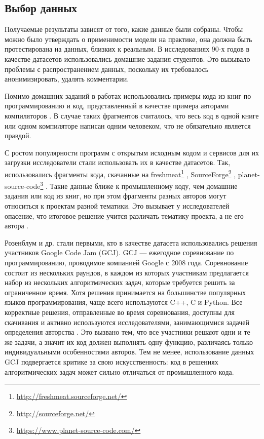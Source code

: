 \subsection{Выбор данных}

Получаемые результаты зависят от того, какие данные были собраны. Чтобы можно было утверждать о применимости модели на практике, она должна быть протестирована на данных, близких к реальным. В исследованиях 90-х годов \cite{Krsul1997, Leach1995} в качестве датасетов использовались домашние задания студентов. Это вызывало проблемы с распространением данных, поскольку их требовалось анонимизировать, удалять комментарии.

Помимо домашних заданий в работах использовались примеры кода из книг по программированию и код, представленный в качестве примера авторами компиляторов \cite{Macdonell1999, Oman1989}. В случае таких фрагментов считалось, что весь код в одной книге или одном компиляторе написан одним человеком, что не обязательно является правдой.

С ростом популярности программ с открытым исходным кодом и сервисов для их загрузки исследователи стали использовать их в качестве датасетов. Так, использовались фрагменты кода, скачанные на freshmeat\footnote{\url{http://freshmeat.sourceforge.net/}} \cite{Frantzeskou2006}, SourceForge\footnote{\url{http://sourceforge.net/}} \cite{Lange2007, Shevertalov2009}, planet-source-code\footnote{\url{https://www.planet-source-code.com/}} \cite{Bandara2013}. Такие данные ближе к промышленному коду, чем домашние задания или код из книг, но при этом фрагменты разных авторов могут относиться к проектам разной тематики. Это вызывает у исследователей опасение, что итоговое решение учится различать тематику проекта, а не его автора \cite{Caliskan2015}.

Розенблум и др. \cite{Rosenblum2011} стали первыми, кто в качестве датасета использовались решения участников Google Code Jam (GCJ). GCJ — ежегодное соревнование по программированию, проводимое компанией Google с 2008 года. Соревнование состоит из нескольких раундов, в каждом из которых участникам предлагается набор из нескольких алгоритмических задач, которые требуется решить за ограниченное время. Хотя решения принимается на большинстве популярных языков программирования, чаще всего используются C++, C и Python. Все корректные решения, отправленные во время соревнования, доступны для скачивания и активно используются исследователями, занимающимися задачей определения авторства \cite{Rosenblum2011, Caliskan2015, Alsulami2017, Simko2018}. Это вызвано тем, что все участники решают одни и те же задачи, а значит их код должен выполнять одну функцию, различаясь только индивидуальными особенностями авторов. Тем не менее, использование данных GCJ подвергается критике \cite{Dauber2017} за свою искусственность: код в решениях алгоритмических задач может сильно отличаться от промышленного кода.

